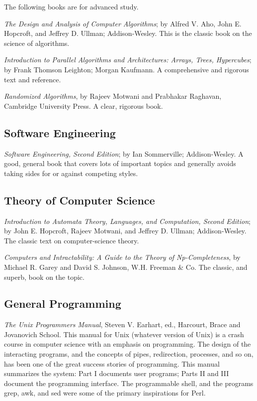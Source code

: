 The following books are for advanced study.

\textit{The Design and Analysis of Computer Algorithms}; by Alfred V. Aho, John E. Hopcroft, and Jeffrey D. Ullman; Addison-Wesley. This is the classic book on the science of algorithms.

\textit{Introduction to Parallel Algorithms and Architectures: Arrays, Trees, Hypercubes}; by Frank Thomson Leighton; Morgan Kaufmann. A comprehensive and rigorous text and reference.

\textit{Randomized Algorithms}, by Rajeev Motwani and Prabhakar Raghavan, Cambridge University Press. A clear, rigorous book.

\subsection{Software Engineering}
\textit{Software Engineering, Second Edition}; by Ian Sommerville; Addison-Wesley. A good, general book that covers lots of important topics and generally avoids taking sides for or against competing styles.

\subsection{Theory of Computer Science}
\textit{Introduction to Automata Theory, Languages, and Computation, Second Edition}; by John E. Hopcroft, Rajeev Motwani, and Jeffrey D. Ullman; Addison-Wesley. The classic text on computer-science theory.

\textit{Computers and Intractability: A Guide to the Theory of Np-Completeness}, by Michael R. Garey and David S. Johnson, W.H. Freeman \& Co. The classic, and superb, book on the topic.

\subsection{General Programming}
\textit{The Unix Programmers Manual}, Steven V. Earhart, ed., Harcourt, Brace and Jovanovich School. This manual for Unix (whatever version of Unix) is a crash course in computer science with an emphasis on programming. The design of the interacting programs, and the concepts of pipes, redirection, processes, and so on, has been one of the great success stories of programming. This manual summarizes the system: Part I documents user programs; Parts II and III document the programming interface. The programmable shell, and the programs grep, awk, and sed were some of the primary inspirations for Perl.

